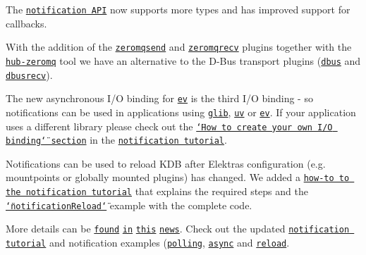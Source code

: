 \begin{DoxyItemize}
\item The \href{https://doc.libelektra.org/api/current/html/group__kdbnotification.html}{\tt notification A\+PI} now supports more types and has improved support for callbacks.
\item With the addition of the \href{https://www.libelektra.org/plugins/zeromqsend}{\tt zeromqsend} and \href{https://www.libelektra.org/plugins/zeromqrecv}{\tt zeromqrecv} plugins together with the \href{https://www.libelektra.org/tools/hub-zeromq}{\tt hub-\/zeromq} tool we have an alternative to the D-\/\+Bus transport plugins (\href{https://www.libelektra.org/plugins/dbus}{\tt dbus} and \href{https://www.libelektra.org/plugins/dbusrecv}{\tt dbusrecv}).
\item The new asynchronous I/O binding for \href{https://www.libelektra.org/bindings/io_ev}{\tt ev} is the third I/O binding -\/ so notifications can be used in applications using \href{https://www.libelektra.org/bindings/io_glib}{\tt glib}, \href{https://www.libelektra.org/bindings/io_uv}{\tt uv} or \href{https://www.libelektra.org/bindings/io_ev}{\tt ev}. If your application uses a different library please check out the \href{https://www.libelektra.org/tutorials/notifications#how-to-create-your-own-i-o-binding}{\tt \char`\"{}\+How to create your own I/\+O binding\char`\"{} section} in the \href{https://www.libelektra.org/tutorials/notifications}{\tt notification tutorial}.
\item Notifications can be used to reload K\+DB after Elektra\textquotesingle{}s configuration (e.\+g. mountpoints or globally mounted plugins) has changed. We added a \href{https://www.libelektra.org/tutorials/notifications#howto-reload-kdb-when-elektras-configuration-has-changed}{\tt how-\/to to the notification tutorial} that explains the required steps and the \href{https://www.libelektra.org/examples/notificationreload}{\tt \char`\"{}notification\+Reload\char`\"{}} example with the complete code.
\end{DoxyItemize}

More details can be \href{#zeromq-transport-plugins}{\tt found} \href{#misc}{\tt in} \href{#bindings}{\tt this} \href{#notifications}{\tt news}. Check out the updated \href{https://www.libelektra.org/tutorials/notifications}{\tt notification tutorial} and notification examples (\href{https://www.libelektra.org/examples/notificationpolling}{\tt polling}, \href{https://www.libelektra.org/examples/notificationasync}{\tt async} and \href{https://www.libelektra.org/examples/notificationreload}{\tt reload}.

